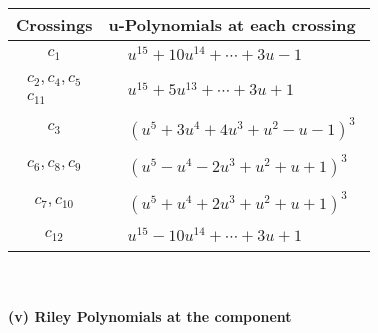 \documentclass[1p]{elsarticle_modified}
\theoremstyle{definition}
\begin{document}
\begin{tabular}{m{50pt}|m{274pt}}
Crossings & \hspace{64pt}u-Polynomials at each crossing \\
\hline $$\begin{aligned}c_{1}\end{aligned}$$&$\begin{aligned}
&u^{15}+10 u^{14}+\cdots+3 u-1
\end{aligned}$\\
\hline $$\begin{aligned}c_{2},c_{4},c_{5}\\c_{11}\end{aligned}$$&$\begin{aligned}
&u^{15}+5 u^{13}+\cdots+3 u+1
\end{aligned}$\\
\hline $$\begin{aligned}c_{3}\end{aligned}$$&$\begin{aligned}
&(u^5+3 u^4+4 u^3+u^2- u-1)^3
\end{aligned}$\\
\hline $$\begin{aligned}c_{6},c_{8},c_{9}\end{aligned}$$&$\begin{aligned}
&(u^5- u^4-2 u^3+u^2+u+1)^3
\end{aligned}$\\
\hline $$\begin{aligned}c_{7},c_{10}\end{aligned}$$&$\begin{aligned}
&(u^5+u^4+2 u^3+u^2+u+1)^3
\end{aligned}$\\
\hline $$\begin{aligned}c_{12}\end{aligned}$$&$\begin{aligned}
&u^{15}-10 u^{14}+\cdots+3 u+1
\end{aligned}$\\
\hline
\end{tabular}\\~\\
\newpage\renewcommand{\arraystretch}{1}
\flushleft \textbf{(v) Riley Polynomials at the component}\newline \\
\end{document}
